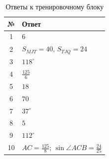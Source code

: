 \documentclass[a4paper,12pt]{article}
\begin{document}
\begin{table}[h!]
\centering

\caption{Ответы к тренировочному блоку}

\begin{tabularx}{\linewidth}{@{}cX@{}}

\toprule
\textbf{№} & \textbf{Ответ} \\
\midrule

1 &
$6$
\\

2 &
$S_{MJT}=40$,
$S_{TJQ}=24$
\\

3 &
$118^\circ$
\\

4 &
$\displaystyle \frac{125}{6}$
\\

5 &
$18$
\\

6 &
$70$
\\

7 &
$37^\circ$
\\

8 &
$5$
\\

9 &
$112^\circ$
\\

10 &
$\displaystyle AC=\frac{125}{8}$;
$\displaystyle \sin\angle ACB=\frac{24}{25}$
\\

\bottomrule

\end{tabularx}
\end{table}
\end{document}
